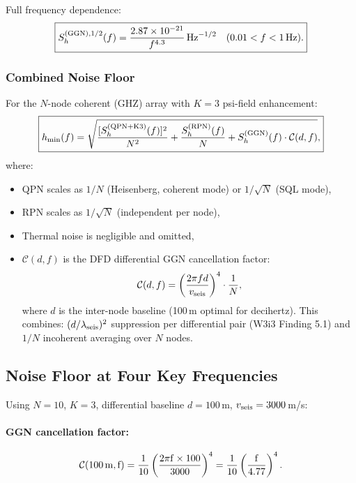 \documentclass[11pt]{article}
\theoremstyle{definition}
\theoremstyle{remark}
\newcommand{\sqrtHz}{\,\mathrm{Hz}^{-1/2}}
\newcommand{\ee}[1]{\times10^{#1}}
\begin{document}
Full frequency dependence:
\begin{equation}
\boxed{
S_h^{(\rm GGN),1/2}(f) = \frac{2.87\ee{-21}}{f^{4.3}}\sqrtHz
\quad (0.01 < f < 1\,\rm Hz).
}
\label{eq:GGN-boxed}
\end{equation}

\subsubsection{Combined Noise Floor}

For the $N$-node coherent (GHZ) array with $K=3$ psi-field enhancement:
\begin{equation}
\boxed{
h_{\min}(f) = \sqrt{
\frac{[S_h^{(\rm QPN+K3)}(f)]^2}{N^2}
+ \frac{S_h^{(\rm RPN)}(f)}{N}
+ S_h^{(\rm GGN)}(f) \cdot \mathcal{C}(d,f)
},
}
\label{eq:hmin-master}
\end{equation}
where:
\begin{itemize}
\item QPN scales as $1/N$ (Heisenberg, coherent mode) or $1/\sqrt{N}$ (SQL mode),
\item RPN scales as $1/\sqrt{N}$ (independent per node),
\item Thermal noise is negligible and omitted,
\item $\mathcal{C}(d,f)$ is the DFD differential GGN cancellation factor:
\begin{equation}
\mathcal{C}(d,f) = \left(\frac{2\pi f d}{v_{\rm seis}}\right)^4
\cdot \frac{1}{N},
\label{eq:GGN-cancel}
\end{equation}
where $d$ is the inter-node baseline (100\,m optimal for decihertz).
This combines: $(d/\lambda_{\rm seis})^2$ suppression per differential
pair (W3i3 Finding 5.1) and $1/N$ incoherent averaging over $N$ nodes.
\end{itemize}

\subsection{Noise Floor at Four Key Frequencies}

Using $N = 10$, $K = 3$, differential baseline $d = 100$\,m,
$v_{\rm seis} = 3000$\,m/s:

\paragraph{GGN cancellation factor:}
\begin{equation}
\mathcal{C}(100\,\rm m, f) = \frac{1}{10}
\left(\frac{2\pi f \times 100}{3000}\right)^4
= \frac{1}{10}
\left(\frac{f}{4.77}\right)^4.
\end{equation}
\end{document}
